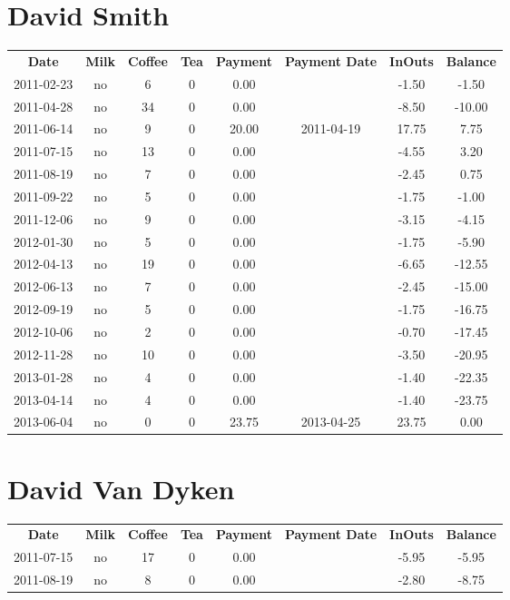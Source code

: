 \section{David Smith}

\begin{center}
\begin{tabular}{cccccccc}
\textbf{Date} & \textbf{Milk} & \textbf{Coffee} & \textbf{Tea} & \textbf{Payment} & \textbf{Payment Date} & \textbf{InOuts} & \textbf{Balance} \\
2011-02-23 & no &  6 & 0 &  0.00 &  & -1.50 &  -1.50\\ 
2011-04-28 & no & 34 & 0 &  0.00 &  & -8.50 & -10.00\\ 
2011-06-14 & no &  9 & 0 & 20.00 & 2011-04-19 & 17.75 &   7.75\\ 
2011-07-15 & no & 13 & 0 &  0.00 &  & -4.55 &   3.20\\ 
2011-08-19 & no &  7 & 0 &  0.00 &  & -2.45 &   0.75\\ 
2011-09-22 & no &  5 & 0 &  0.00 &  & -1.75 &  -1.00\\ 
2011-12-06 & no &  9 & 0 &  0.00 &  & -3.15 &  -4.15\\ 
2012-01-30 & no &  5 & 0 &  0.00 &  & -1.75 &  -5.90\\ 
2012-04-13 & no & 19 & 0 &  0.00 &  & -6.65 & -12.55\\ 
2012-06-13 & no &  7 & 0 &  0.00 &  & -2.45 & -15.00\\ 
2012-09-19 & no &  5 & 0 &  0.00 &  & -1.75 & -16.75\\ 
2012-10-06 & no &  2 & 0 &  0.00 &  & -0.70 & -17.45\\ 
2012-11-28 & no & 10 & 0 &  0.00 &  & -3.50 & -20.95\\ 
2013-01-28 & no &  4 & 0 &  0.00 &  & -1.40 & -22.35\\ 
2013-04-14 & no &  4 & 0 &  0.00 &  & -1.40 & -23.75\\ 
2013-06-04 & no &  0 & 0 & 23.75 & 2013-04-25 & 23.75 &   0.00
\end{tabular}
\end{center}

\section{David Van Dyken}

\begin{center}
\begin{tabular}{cccccccc}
\textbf{Date} & \textbf{Milk} & \textbf{Coffee} & \textbf{Tea} & \textbf{Payment} & \textbf{Payment Date} & \textbf{InOuts} & \textbf{Balance} \\
2011-07-15 & no & 17 & 0 & 0.00 &  & -5.95 & -5.95\\ 
2011-08-19 & no &  8 & 0 & 0.00 &  & -2.80 & -8.75
\end{tabular}
\end{center}

